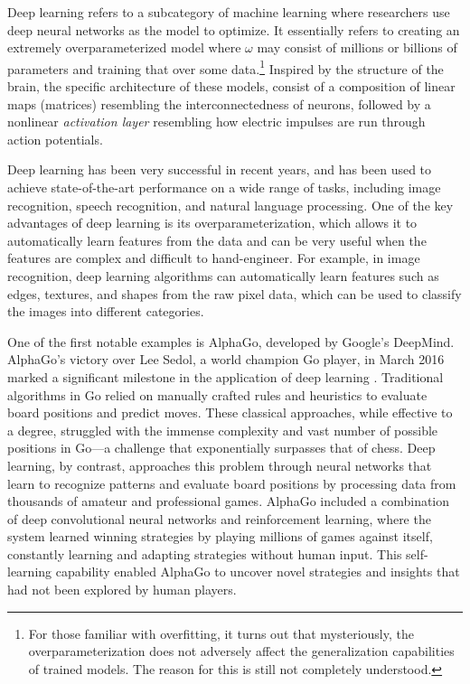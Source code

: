 \documentclass[10pt]{article}
\begin{document}
    Deep learning refers to a subcategory of machine learning where researchers use deep neural networks as the model to optimize. It essentially refers to creating an extremely overparameterized model where $\omega$ may consist of millions or billions of parameters and training that over some data.\footnote{For those familiar with overfitting, it turns out that mysteriously, the overparameterization does not adversely affect the generalization capabilities of trained models. The reason for this is still not completely understood. } Inspired by the structure of the brain, the specific architecture of these models, consist of a composition of linear maps (matrices) resembling the interconnectedness of neurons, followed by a nonlinear \textit{activation layer} resembling how electric impulses are run through action potentials.  

    Deep learning has been very successful in recent years, and has been used to achieve state-of-the-art performance on a wide range of tasks, including image recognition, speech recognition, and natural language processing. One of the key advantages of deep learning is its overparameterization, which allows it to automatically learn features from the data and can be very useful when the features are complex and difficult to hand-engineer. For example, in image recognition, deep learning algorithms can automatically learn features such as edges, textures, and shapes from the raw pixel data, which can be used to classify the images into different categories.
    
    One of the first notable examples is AlphaGo, developed by Google's DeepMind. AlphaGo's victory over Lee Sedol, a world champion Go player, in March 2016 marked a significant milestone in the application of deep learning \cite{alphago}. Traditional algorithms in Go relied on manually crafted rules and heuristics to evaluate board positions and predict moves. These classical approaches, while effective to a degree, struggled with the immense complexity and vast number of possible positions in Go—a challenge that exponentially surpasses that of chess. Deep learning, by contrast, approaches this problem through neural networks that learn to recognize patterns and evaluate board positions by processing data from thousands of amateur and professional games. AlphaGo included a combination of deep convolutional neural networks and reinforcement learning, where the system learned winning strategies by playing millions of games against itself, constantly learning and adapting strategies without human input. This self-learning capability enabled AlphaGo to uncover novel strategies and insights that had not been explored by human players.
\end{document}
